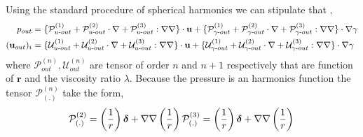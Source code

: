 Using the standard procedure of spherical harmonics we can stipulate that \citep{leal2007advanced,raja2010inertial}, 
\begin{align*}
    p_{out}
    &=
    \{\mathcal{P}_{u\text -out}^{(1)} + \mathcal{P}_{u\text -out}^{(2)}\cdot \mathbf{\nabla} + \mathcal{P}_{u\text -out}^{(3)} :\mathbf{\nabla}\mathbf{\nabla}\}\cdot \textbf{u} 
    +
    \{\mathcal{P}_{\gamma\text -out}^{(1)} + \mathcal{P}_{\gamma\text -out}^{(2)}\cdot \mathbf{\nabla} + \mathcal{P}_{\gamma\text -out}^{(3)} :\mathbf{\nabla}\mathbf{\nabla}\} \cdot \mathbf{\nabla} \gamma\\
    (\textbf{u}_{out})_i
    &=
    \{\mathcal{U}_{u\text -out}^{(1)} + \mathcal{U}_{u\text -out}^{(2)}\cdot \mathbf{\nabla} + \mathcal{U}_{u\text -out}^{(3)} :\mathbf{\nabla}\mathbf{\nabla}\}\cdot \textbf{u} 
    +
    \{\mathcal{U}_{\gamma\text -out}^{(1)} + \mathcal{U}_{\gamma\text -out}^{(2)}\cdot \mathbf{\nabla} + \mathcal{U}_{\gamma\text -out}^{(3)} :\mathbf{\nabla}\mathbf{\nabla}\} \cdot \mathbf{\nabla} \gamma\\
\end{align*}
where $\mathcal{P}_{out}^{(n)},\mathcal{U}_{out}^{(n)}$ are tensor of order $n$ and $n+1$ respectively that are function of $\textbf{r}$ and the viscosity ratio $\lambda$. 
Because the pressure is an harmonics function the tensor $\mathcal{P}_{(.)}^{(n)}$  take the form, 
\begin{equation}
    \mathcal{P}_{(.)}^{(2)}
    =
    \left(\frac{1}{r}\right)\bm\delta
    + 
    \mathbf{\nabla}\mathbf{\nabla} \left(\frac{1}{r}\right) \\
    \mathcal{P}_{(.)}^{(3)}
    =
    \left(\frac{1}{r}\right)\bm\delta
    + 
    \mathbf{\nabla}\mathbf{\nabla} \left(\frac{1}{r}\right) \\
\end{equation}

